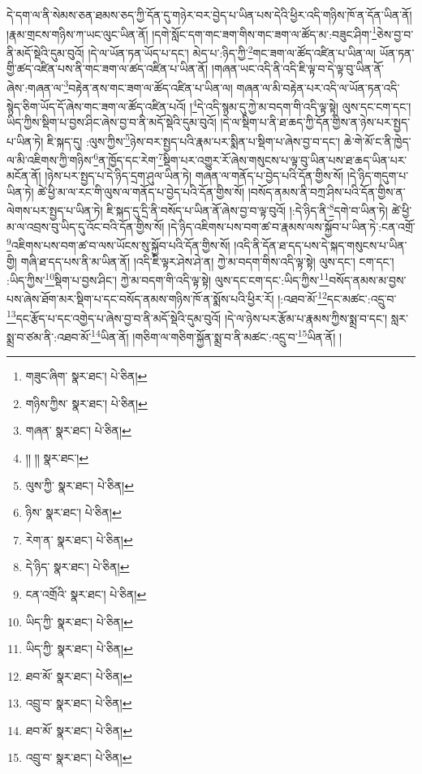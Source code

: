 དེ་དག་ལ་ནི་སེམས་ཅན་ཐམས་ཅད་ཀྱི་དོན་དུ་གཉེར་བར་བྱེད་པ་ཡིན་པས་དེའི་ཕྱིར་འདི་གཉིས་ཁོ་ན་དོན་ཡིན་ནོ། །རྣམ་གྲངས་གཉིས་ཀ་ཡང་ལུང་ཡིན་ནོ། །དགེ་སློང་དག་གང་ཟག་གིས་གང་ཟག་ལ་ཚོད་མ་:བཟུང་ཤིག་\footnote{གཟུང་ཞིག་  སྣར་ཐང་།  པེ་ཅིན། }ཅེས་བྱ་བ་ནི་མདོ་སྡེའི་དུམ་བུའོ། །དེ་ལ་ཡོན་ཏན་ཡོད་པ་དང་། མེད་པ་:ཉིད་ཀྱི་\footnote{གཉིས་ཀྱིས་  སྣར་ཐང་།  པེ་ཅིན། }གང་ཟག་ལ་ཚོད་འཛིན་པ་ཡིན་ལ། ཡོན་ཏན་གྱི་ཚད་འཛིན་པས་ནི་གང་ཟག་ལ་ཚད་འཛིན་པ་ཡིན་ནོ། །གཞན་ཡང་འདི་ནི་འདི་ཇི་ལྟ་བ་དེ་ལྟ་བུ་ཡིན་ནོ་ཞེས་:གཞན་ལ་\footnote{གཞན་  སྣར་ཐང་།  པེ་ཅིན། }བརྟེན་ནས་གང་ཟག་ལ་ཚོད་འཛིན་པ་ཡིན་ལ། གཞན་ལ་མི་བརྟེན་པར་འདི་ལ་ཡོན་ཏན་འདི་སྙེད་ཅིག་ཡོད་དོ་ཞེས་གང་ཟག་ལ་ཚོད་འཛིན་པའོ། །\footnote{།། །།  སྣར་ཐང་། }དེ་འདི་སྙམ་དུ་ཀྱེ་མ་བདག་གི་འདི་ལྟ་སྟེ། ལུས་དང་ངག་དང་། ཡིད་ཀྱིས་སྡིག་པ་བྱས་ཤིང་ཞེས་བྱ་བ་ནི་མདོ་སྡེའི་དུམ་བུའོ། །དེ་ལ་སྡིག་པ་ནི་ཐ་ཆད་ཀྱི་དོན་གྱིས་ན་ཉེས་པར་སྤྱད་པ་ཡིན་ཏེ། ཇི་སྐད་དུ། :ལུས་ཀྱིས་\footnote{ལུས་ཀྱི་  སྣར་ཐང་།  པེ་ཅིན། }ཉེས་བར་སྤྱད་པའི་རྣམ་པར་སྨིན་པ་སྡིག་པ་ཞེས་བྱ་བ་དང་། ཆེ་གེ་མོ་ང་ནི་ཁྱེད་ལ་མི་འཇིགས་ཀྱི་གཉིས་\footnote{ཉིས་  སྣར་ཐང་།  པེ་ཅིན། }ན་ཁྱོད་དང་རེག་\footnote{རེག་ན་  སྣར་ཐང་།  པེ་ཅིན། }སྡིག་པར་འགྱུར་རོ་ཞེས་གསུངས་པ་ལྟ་བུ་ཡིན་པས་ཐ་ཆད་ཡིན་པར་མངོན་ནོ། །ཉེས་པར་སྤྱད་པ་དེ་ཉིད་དྲག་ཤུལ་ཡིན་ཏེ། གཞན་ལ་གནོད་པ་བྱེད་པའི་དོན་གྱིས་སོ། །དེ་ཉིད་གདུག་པ་ཡིན་ཏེ། ཚེ་ཕྱི་མ་ལ་རང་གི་ལུས་ལ་གནོད་པ་བྱེད་པའི་དོན་གྱིས་སོ། །བསོད་ནམས་ནི་བཀྲ་ཤིས་པའི་དོན་གྱིས་ན་ལེགས་པར་སྤྱད་པ་ཡིན་ཏེ། ཇི་སྐད་དུ་དྲི་ནི་བསོད་པ་ཡིན་ནོ་ཞེས་བྱ་བ་ལྟ་བུའོ། །:དེ་ཉིད་ནི་\footnote{དེ་ཉིད་  སྣར་ཐང་།  པེ་ཅིན། }དགེ་བ་ཡིན་ཏེ། ཚེ་ཕྱི་མ་ལ་འབྲས་བུ་ཡིད་དུ་འོང་བའི་དོན་གྱིས་སོ། །དེ་ཉིད་འཇིགས་པས་བག་ཚ་བ་རྣམས་ལས་སྐྱོབ་པ་ཡིན་ཏེ་:ངན་འགྲོ་\footnote{ངན་འགྲོའི་  སྣར་ཐང་།  པེ་ཅིན། }འཇིགས་པས་བག་ཚ་བ་ལས་ཡོངས་སུ་སྐྱོབ་པའི་དོན་གྱིས་སོ། །འདི་ནི་དོན་ཐ་དད་པས་དེ་སྐད་གསུངས་པ་ཡིན་གྱི། གཞི་ཐ་དད་པས་ནི་མ་ཡིན་ནོ། །འདི་ཇི་ལྟར་ཤེས་ཤེ་ན། ཀྱེ་མ་བདག་གིས་འདི་ལྟ་སྟེ། ལུས་དང་། ངག་དང་། :ཡིད་ཀྱིས་\footnote{ཡིད་ཀྱི་  སྣར་ཐང་།  པེ་ཅིན། }སྡིག་པ་བྱས་ཤིང་། ཀྱེ་མ་བདག་གི་འདི་ལྟ་སྟེ། ལུས་དང་ངག་དང་:ཡིད་ཀྱིས་\footnote{ཡིད་ཀྱི་  སྣར་ཐང་།  པེ་ཅིན། }བསོད་ནམས་མ་བྱས་པས་ཞེས་ཐོག་མར་སྡིག་པ་དང་བསོད་ནམས་གཉིས་ཁོ་ན་སྨོས་པའི་ཕྱིར་རོ། །:འཐབ་མོ་\footnote{ཐབ་མོ་  སྣར་ཐང་།  པེ་ཅིན། }དང་མཚང་:འདྲུ་བ་\footnote{འབྲུ་བ་  སྣར་ཐང་།  པེ་ཅིན། }དང་རྩོད་པ་དང་འགྱེད་པ་ཞེས་བྱ་བ་ནི་མདོ་སྡེའི་དུམ་བུའོ། །དེ་ལ་ཉེས་པར་རྩོམ་པ་རྣམས་ཀྱིས་སྨྲ་བ་དང་། སླར་སྨྲ་བ་ཙམ་ནི་:འཐབ་མོ་\footnote{ཐབ་མོ་  སྣར་ཐང་།  པེ་ཅིན། }ཡིན་ནོ། །གཅིག་ལ་གཅིག་སྐྱོན་སྨྲ་བ་ནི་མཚང་:འདྲུ་བ་\footnote{འབྲུ་བ་  སྣར་ཐང་།  པེ་ཅིན། }ཡིན་ནོ། །

